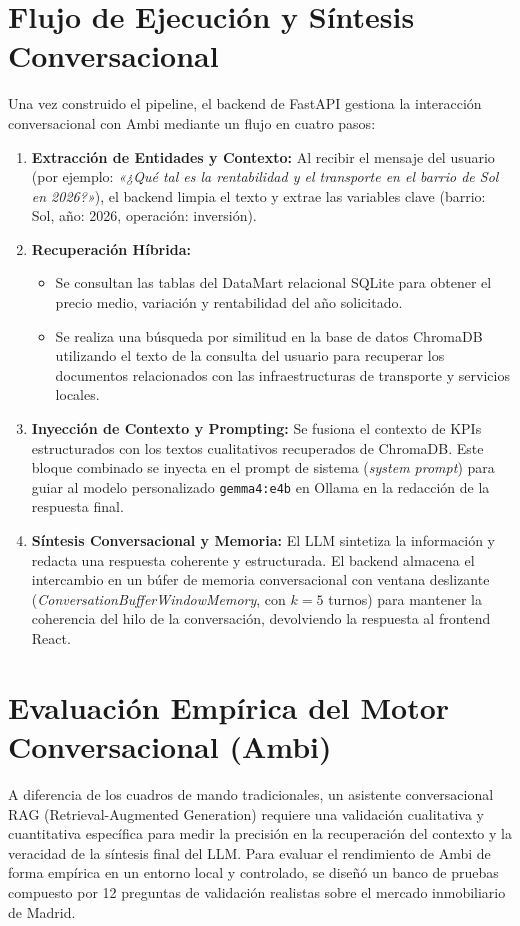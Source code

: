 \documentclass[a4paper,11pt,openany]{book}
\begin{document}
\section{Flujo de Ejecución y Síntesis Conversacional}
Una vez construido el pipeline, el backend de FastAPI gestiona la interacción conversacional con Ambi mediante un flujo en cuatro pasos:
\begin{enumerate}
    \item \textbf{Extracción de Entidades y Contexto:} Al recibir el mensaje del usuario (por ejemplo: \textit{«¿Qué tal es la rentabilidad y el transporte en el barrio de Sol en 2026?»}), el backend limpia el texto y extrae las variables clave (barrio: Sol, año: 2026, operación: inversión).
    \item \textbf{Recuperación Híbrida:}
    \begin{itemize}
        \item Se consultan las tablas del DataMart relacional SQLite para obtener el precio medio, variación y rentabilidad del año solicitado.
        \item Se realiza una búsqueda por similitud en la base de datos ChromaDB utilizando el texto de la consulta del usuario para recuperar los documentos relacionados con las infraestructuras de transporte y servicios locales.
    \end{itemize}
    \item \textbf{Inyección de Contexto y Prompting:} Se fusiona el contexto de KPIs estructurados con los textos cualitativos recuperados de ChromaDB. Este bloque combinado se inyecta en el prompt de sistema (\textit{system prompt}) para guiar al modelo personalizado \texttt{gemma4:e4b} en Ollama en la redacción de la respuesta final.
    \item \textbf{Síntesis Conversacional y Memoria:} El LLM sintetiza la información y redacta una respuesta coherente y estructurada. El backend almacena el intercambio en un búfer de memoria conversacional con ventana deslizante (\textit{ConversationBufferWindowMemory}, con $k=5$ turnos) para mantener la coherencia del hilo de la conversación, devolviendo la respuesta al frontend React.
\end{enumerate}

\section{Evaluación Empírica del Motor Conversacional (Ambi)}
A diferencia de los cuadros de mando tradicionales, un asistente conversacional RAG (Retrieval-Augmented Generation) requiere una validación cualitativa y cuantitativa específica para medir la precisión en la recuperación del contexto y la veracidad de la síntesis final del LLM. Para evaluar el rendimiento de Ambi de forma empírica en un entorno local y controlado, se diseñó un banco de pruebas compuesto por 12 preguntas de validación realistas sobre el mercado inmobiliario de Madrid. 
\end{document}
